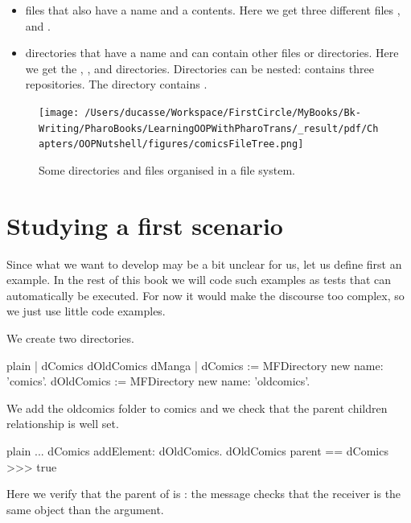 \documentclass[10pt,twoside,english]{_support/latex/sbabook/sbabook}
\begin{document}
\begin{itemize}
\item files that also have a name and a contents. Here we get three different files ,  and .
\item directories that have a name and can contain other files or directories. Here we get the , ,  and  directories. Directories can be nested:  contains three repositories. The  directory contains . 
\end{itemize}


\begin{figure}

\begin{center}
\texttt{[image: /Users/ducasse/Workspace/FirstCircle/MyBooks/Bk-Writing/PharoBooks/LearningOOPWithPharoTrans/\_result/pdf/Chapters/OOPNutshell/figures/comicsFileTree.png]}\caption{Some directories and files organised in a file system.\label{figdirectories}}\end{center}
\end{figure}

\section{Studying a first scenario}
Since what we want to develop may be a bit unclear for us, let us define first an example. In the rest of this book we will code such examples as tests that can automatically be executed. For now it would make the discourse too complex, so we just use little code examples. 

We create two directories.

\begin{displaycode}{plain}
| dComics dOldComics dManga |
dComics := MFDirectory new name: 'comics'.
dOldComics := MFDirectory new name: 'oldcomics'.
\end{displaycode}

We add the oldcomics folder to comics and we check that the parent children relationship is well set. 

\begin{displaycode}{plain}
	...
dComics addElement: dOldComics. 
dOldComics parent == dComics
>>> true
\end{displaycode}

Here we verify that the parent of  is : the message \textcode{ == } checks that the receiver is the same object than the argument.  
\end{document}
